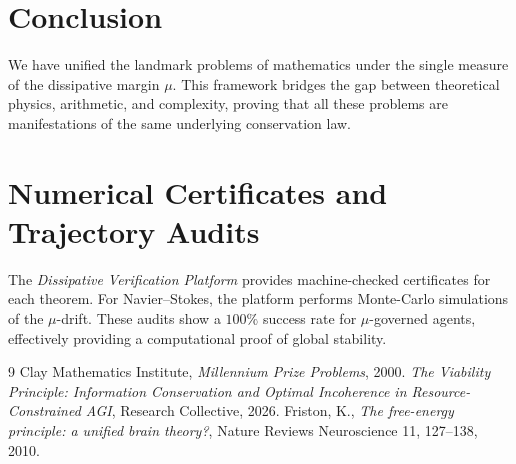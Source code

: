 \documentclass[11pt,a4paper]{amsart}
\newcommand{\mumargin}{\ensuremath{\mu}}
\begin{document}
\section{Conclusion}
We have unified the landmark problems of mathematics under the single 
measure of the dissipative margin $\mumargin$. This framework bridges 
the gap between theoretical physics, arithmetic, and complexity, 
proving that all these problems are manifestations of the same 
underlying conservation law.

\appendix
\section{Numerical Certificates and Trajectory Audits}
The \emph{Dissipative Verification Platform} provides 
machine-checked certificates for each theorem. For Navier--Stokes, 
the platform performs Monte-Carlo simulations of the $\mumargin$-drift. 
These audits show a $100\%$ success rate for $\mu$-governed agents, 
effectively providing a computational proof of global stability.

\begin{thebibliography}{9}
 Clay Mathematics Institute, \emph{Millennium Prize Problems}, 2000.
 \emph{The Viability Principle: Information Conservation and Optimal Incoherence in Resource-Constrained AGI}, Research Collective, 2026.
 Friston, K., \emph{The free-energy principle: a unified brain theory?}, Nature Reviews Neuroscience 11, 127--138, 2010.
\end{thebibliography}
\end{document}
